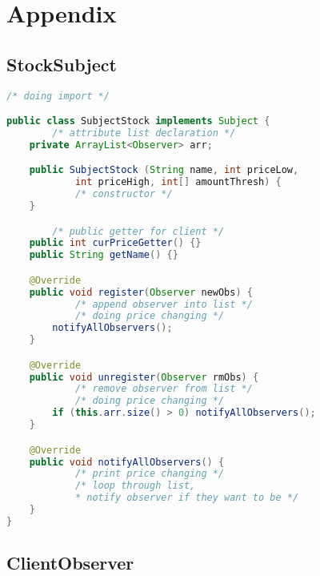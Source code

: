 \documentclass[a4paper]{article}
\begin{document}
\newpage

\section{Appendix}%
\label{sec:appendix}

\subsection{StockSubject}%
\label{sub:stocksubject}

\begin{lstlisting}[language=java]
/* doing import */

public class SubjectStock implements Subject {
        /* attribute list declaration */
	private ArrayList<Observer> arr;

	public SubjectStock (String name, int priceLow,
            int priceHigh, int[] amountThresh) {
            /* constructor */
	}

        /* public getter for client */
	public int curPriceGetter() {}
	public String getName() {}

	@Override
	public void register(Observer newObs) {
            /* append observer into list */
            /* doing price changing */
	    notifyAllObservers();
	}

	@Override
	public void unregister(Observer rmObs) {
            /* remove observer from list */
            /* doing price changing */
	    if (this.arr.size() > 0) notifyAllObservers();
	}

	@Override
	public void notifyAllObservers() {
            /* print price changing */
            /* loop through list,
            * notify observer if they want to be */
	}
}
\end{lstlisting}

\newpage

\subsection{ClientObserver}%
\label{sub:clientobserver}
\end{document}
